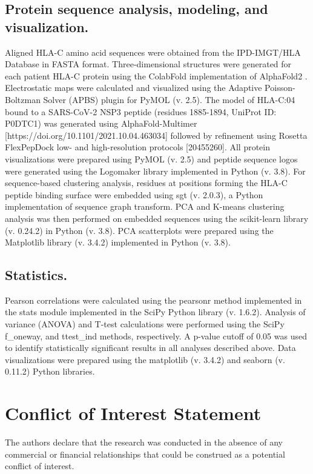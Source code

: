 \documentclass[utf8]{frontiersinFPHY_FAMS} %
\begin{document}
\subsection*{Protein sequence analysis, modeling, and visualization.} Aligned HLA-C amino acid sequences were obtained from the IPD-IMGT/HLA Database \citep{31667505} in FASTA format. Three-dimensional structures were generated for each patient HLA-C protein using the ColabFold \citep{35637307} implementation of AlphaFold2 \citep{34265844}. Electrostatic maps were calculated and visualized using the Adaptive Poisson-Boltzman Solver (APBS) plugin for PyMOL (v. 2.5). The model of HLA-C:04 bound to a SARS-CoV-2 NSP3 peptide (residues 1885-1894, UniProt ID: P0DTC1) was generated using AlphaFold-Multimer [https://doi.org/10.1101/2021.10.04.463034] followed by refinement using Rosetta FlexPepDock low- and high-resolution protocols [20455260]. All protein visualizations were prepared using PyMOL (v. 2.5) and peptide sequence logos were generated using the Logomaker library implemented in Python (v. 3.8). For sequence-based clustering analysis, residues at positions forming the HLA-C peptide binding surface were embedded using sgt (v. 2.0.3), a Python implementation of sequence graph transform. PCA and K-means clustering analysis was then performed on embedded sequences using the scikit-learn library (v. 0.24.2) in Python (v. 3.8). PCA scatterplots were prepared using the Matplotlib library (v. 3.4.2) implemented in Python (v. 3.8).

\subsection*{Statistics.} Pearson correlations were calculated using the pearsonr method implemented in the stats module implemented in the SciPy Python library (v. 1.6.2). Analysis of variance (ANOVA) and T-test calculations were performed using the SciPy f\_oneway, and ttest\_ind methods, respectively. A p-value cutoff of 0.05 was used to identify statistically significant results in all analyses described above. Data visualizations were prepared using the matplotlib (v. 3.4.2) and seaborn (v. 0.11.2) Python libraries. 

\section*{Conflict of Interest Statement}
The authors declare that the research was conducted in the absence of any commercial or financial relationships that could be construed as a potential conflict of interest.
\end{document}
